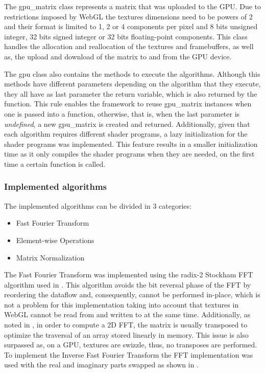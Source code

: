         The gpu\_matrix class represents a matrix that was uploaded to the GPU. Due to restrictions imposed by WebGL the textures dimensions need to be powers of 2 and their format is limited to 1, 2 or 4 components per pixel and 8 bits unsigned integer, 32 bits signed integer or 32 bits floating-point components. This class handles the allocation and reallocation of the textures and framebuffers, as well as, the upload and download of the matrix to and from the GPU device.
        
        The gpu class also contains the methods to execute the algorithms. Although this methods have different parameters depending on the algorithm that they execute, they all have as last parameter the return variable, which is also returned by the function. This rule enables the framework to reuse gpu\_matrix instances when one is passed into a function, otherwise, that is, when the last parameter is \textit{undefined}, a new gpu\_matrix is created and returned. Additionally, given that each algorithm requires different shader programs, a lazy initialization for the shader programs was implemented. This feature results in a smaller initialization time as it only compiles the shader programs when they are needed, on the first time a certain function is called.
      
	  \subsubsection{Implemented algorithms}
	  
	    The implemented algorithms can be divided in 3 categories:
	    \begin{itemize}
	      \item Fast Fourier Transform
	      \item Element-wise Operations
	      \item Matrix Normalization
	    \end{itemize}
	    
	    The Fast Fourier Transform was implemented using the radix-2 Stockham FFT algorithm used in \cite{Lloyd2008}. This algorithm avoids the bit reversal phase of the FFT by reordering the dataflow and, consequently, cannot be performed in-place, which is not a problem for this implementation taking into account that textures in WebGL cannot be read from and written to at the same time. Additionally, as noted in \cite{Lloyd2008}, in order to compute a 2D FFT, the matrix is usually transposed to optimize the traversal of an array stored linearly in memory. This issue is also surpassed as, on a GPU, textures are swizzle, thus, no transposes are performed. 
	    To implement the Inverse Fast Fourier Transform the FFT implementation was used with the real and imaginary parts swapped as shown in \cite[p.450]{Lyons2004}.
	    
